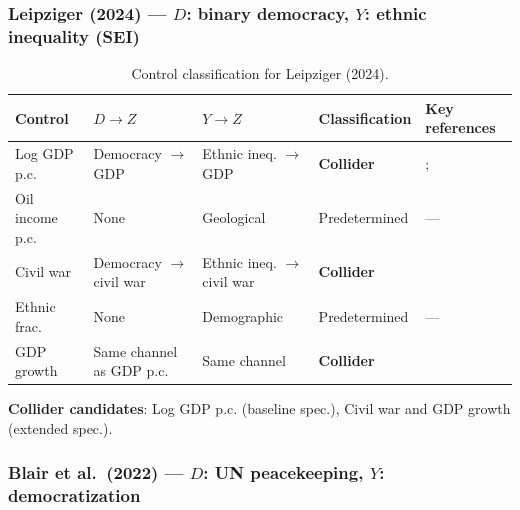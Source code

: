 \documentclass[
]{article}
\begin{document}
\subsubsection{\texorpdfstring{Leipziger (2024) --- \(D\): binary
democracy, \(Y\): ethnic inequality
(SEI)}{Leipziger (2024) --- D: binary democracy, Y: ethnic inequality (SEI)}}\label{leipziger-2024-d-binary-democracy-y-ethnic-inequality-sei}

\begin{table}[H]
\centering
\small
\caption{Control classification for Leipziger (2024).}
\begin{tabular}{llllp{3cm}}
\toprule
Control & $D \to Z$ & $Y \to Z$ & Classification & Key references \\
\midrule
Log GDP p.c. & Democracy $\to$ GDP & Ethnic ineq. $\to$ GDP & \textbf{Collider} & \citet{acemoglu_etal2019}; \citet{grundler_link2024} \\
Oil income p.c. & None & Geological & Predetermined & --- \\
Civil war & Democracy $\to$ civil war & Ethnic ineq. $\to$ civil war & \textbf{Collider} & \citet{cederman_etal2013} \\
Ethnic frac. & None & Demographic & Predetermined & --- \\
GDP growth & Same channel as GDP p.c. & Same channel & \textbf{Collider} & \citet{acemoglu_etal2019} \\
\bottomrule
\end{tabular}
\end{table}

\textbf{Collider candidates}: Log GDP p.c. (baseline spec.), Civil war
and GDP growth (extended spec.).

\subsubsection{\texorpdfstring{Blair et al.~(2022) --- \(D\): UN
peacekeeping, \(Y\):
democratization}{Blair et al.~(2022) --- D: UN peacekeeping, Y: democratization}}\label{blair-et-al.-2022-d-un-peacekeeping-y-democratization}
\end{document}
